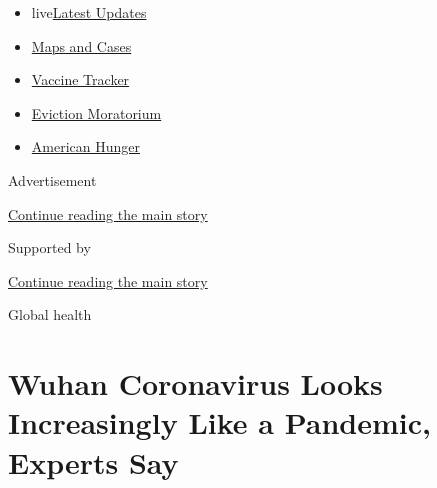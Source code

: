 \begin{itemize}
\tightlist
\item
  live\href{https://www.nytimes3xbfgragh.onion/2020/09/09/world/covid-19-coronavirus.html?name=styln-coronavirus-national\&region=TOP_BANNER\&block=storyline_menu_recirc\&action=click\&pgtype=Article\&impression_id=4eeb4451-f29d-11ea-b48a-7b43fab1412c\&variant=undefined}{Latest
  Updates}
\item
  \href{https://www.nytimes3xbfgragh.onion/interactive/2020/us/coronavirus-us-cases.html?name=styln-coronavirus-national\&region=TOP_BANNER\&block=storyline_menu_recirc\&action=click\&pgtype=Article\&impression_id=4eeb6b60-f29d-11ea-b48a-7b43fab1412c\&variant=undefined}{Maps
  and Cases}
\item
  \href{https://www.nytimes3xbfgragh.onion/interactive/2020/science/coronavirus-vaccine-tracker.html?name=styln-coronavirus-national\&region=TOP_BANNER\&block=storyline_menu_recirc\&action=click\&pgtype=Article\&impression_id=4eeb6b61-f29d-11ea-b48a-7b43fab1412c\&variant=undefined}{Vaccine
  Tracker}
\item
  \href{https://www.nytimes3xbfgragh.onion/2020/09/02/your-money/eviction-moratorium-covid.html?name=styln-coronavirus-national\&region=TOP_BANNER\&block=storyline_menu_recirc\&action=click\&pgtype=Article\&impression_id=4eeb6b62-f29d-11ea-b48a-7b43fab1412c\&variant=undefined}{Eviction
  Moratorium}
\item
  \href{https://www.nytimes3xbfgragh.onion/interactive/2020/09/02/magazine/food-insecurity-hunger-us.html?name=styln-coronavirus-national\&region=TOP_BANNER\&block=storyline_menu_recirc\&action=click\&pgtype=Article\&impression_id=4eeb6b63-f29d-11ea-b48a-7b43fab1412c\&variant=undefined}{American
  Hunger}
\end{itemize}

Advertisement

\protect\hyperlink{after-top}{Continue reading the main story}

Supported by

\protect\hyperlink{after-sponsor}{Continue reading the main story}

Global health

\hypertarget{wuhan-coronavirus-looks-increasingly-like-a-pandemic-experts-say}{%
\section{Wuhan Coronavirus Looks Increasingly Like a Pandemic, Experts
Say}\label{wuhan-coronavirus-looks-increasingly-like-a-pandemic-experts-say}}

